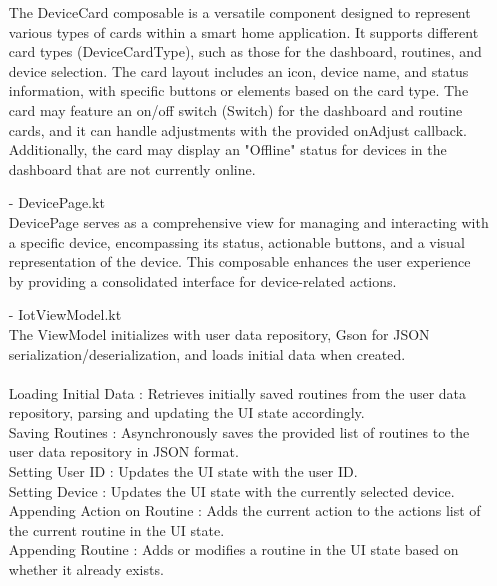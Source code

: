 \begin{enumerate}
            The DeviceCard composable is a versatile component designed to represent various types of cards within a smart home application. It supports different card types (DeviceCardType), such as those for the dashboard, routines, and device selection. The card layout includes an icon, device name, and status information, with specific buttons or elements based on the card type. The card may feature an on/off switch (Switch) for the dashboard and routine cards, and it can handle adjustments with the provided onAdjust callback. Additionally, the card may display an "Offline" status for devices in the dashboard that are not currently online.\\
      \item[-] DevicePage.kt \\
            DevicePage serves as a comprehensive view for managing and interacting with a specific device, encompassing its status, actionable buttons, and a visual representation of the device. This composable enhances the user experience by providing a consolidated interface for device-related actions.\\
      \item[-] IotViewModel.kt \\
            The ViewModel initializes with user data repository, Gson for JSON serialization/deserialization, and loads initial data when created.\\\\
            Loading Initial Data : Retrieves initially saved routines from the user data repository, parsing and updating the UI state accordingly.\\

            Saving Routines : Asynchronously saves the provided list of routines to the user data repository in JSON format.\\

            Setting User ID : Updates the UI state with the user ID.\\

            Setting Device : Updates the UI state with the currently selected device.\\

            Appending Action on Routine : Adds the current action to the actions list of the current routine in the UI state.\\

            Appending Routine : Adds or modifies a routine in the UI state based on whether it already exists.\\


\end{enumerate}
